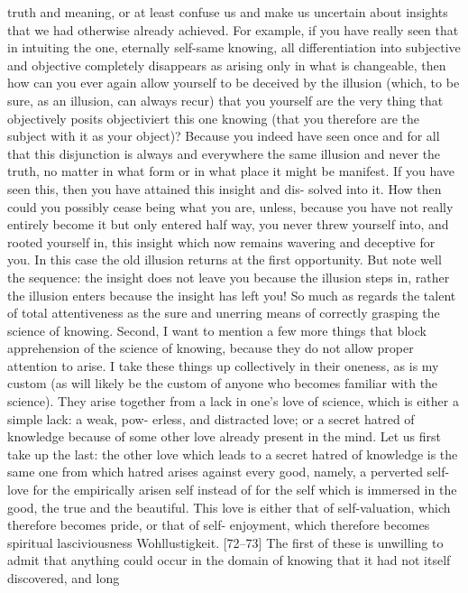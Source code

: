 truth and meaning, or at least confuse us and make us uncertain about insights
that we had otherwise already achieved. For example, if you have really seen
that in intuiting the one, eternally self-same knowing, all differentiation into
subjective and objective completely disappears as arising only in what is
changeable, then how can you ever again allow yourself to be deceived by the
illusion (which, to be sure, as an illusion, can always recur) that you yourself
are the very thing that objectively posits {objectiviert} this one knowing (that
you therefore are the subject with it as your object)? Because you indeed have
seen once and for all that this disjunction is always and everywhere the same
illusion and never the truth, no matter in what form or in what place it might
be manifest. If you have seen this, then you have attained this insight and dis-
solved into it. How then could you possibly cease being what you are, unless,
because you have not really entirely become it but only entered half way, you
never threw yourself into, and rooted yourself in, this insight which now
remains wavering and deceptive for you. In this case the old illusion returns at
the first opportunity. But note well the sequence: the insight does not leave
you because the illusion steps in, rather the illusion enters because the insight
has left you! So much as regards the talent of total attentiveness as the sure
and unerring means of correctly grasping the science of knowing. Second, I
want to mention a few more things that block apprehension of the science of
knowing, because they do not allow proper attention to arise. I take these
things up collectively in their oneness, as is my custom (as will likely be the
custom of anyone who becomes familiar with the science). They arise together
from a lack in one’s love of science, which is either a simple lack: a weak, pow-
erless, and distracted love; or a secret hatred of knowledge because of some
other love already present in the mind.
Let us first take up the last: the other love which leads to a secret hatred
of knowledge is the same one from which hatred arises against every good,
namely, a perverted self-love for the empirically arisen self instead of for the
self which is immersed in the good, the true and the beautiful. This love is
either that of self-valuation, which therefore becomes pride, or that of self-
enjoyment, which therefore becomes spiritual lasciviousness {Wohllustigkeit}.
[72–73] The first of these is unwilling to admit that anything could
occur in the domain of knowing that it had not itself discovered, and long
